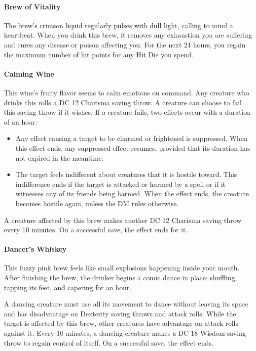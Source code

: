     \paragraph{Brew of Vitality} %
        The brew's crimson liquid regularly pulses with dull light, calling to mind a heartbeat.
        When you drink this brew, it removes any exhaustion you are suffering and cures any disease or poison affecting you.
        For the next 24 hours, you regain the maximum number of hit points for any Hit Die you spend.
    \paragraph{Calming Wine} %
        This wine's fruity flavor seems to calm emotions on command.
        Any creature who drinks this rolls a DC 12 Charisma saving throw.
        A creature can choose to fail this saving throw if it wishes.
        If a creature fails, two effects occur with a duration of an hour:
        \begin{itemize}
            \item Any effect causing a target to be charmed or frightened is suppressed.
            When this effect ends, any suppressed effect resumes, provided that its duration has not expired in the meantime.
            \item The target feels indifferent about creatures that it is hostile toward.
            This indifference ends if the target is attacked or harmed by a spell or if it witnesses any of its friends being harmed.
            When the effect ends, the creature becomes hostile again, unless the DM rules otherwise.
        \end{itemize}

        A creature affected by this brew makes another DC 12 Charisma saving throw every 10 minutes.
        On a successful save, the effect ends for it.
    \paragraph{Dancer's Whiskey} %
        This fuzzy pink brew feels like small explosions happening inside your mouth.
        After finishing the brew, the drinker begins a comic dance in place: shuffling, tapping its feet, and capering for an hour.

        A dancing creature must use all its movement to dance without leaving its space and has disadvantage on Dexterity saving throws and attack rolls.
        While the target is affected by this brew, other creatures have advantage on attack rolls against it.
        Every 10 minutes, a dancing creature makes a DC 18 Wisdom saving throw to regain control of itself.
        On a successful save, the effect ends.
